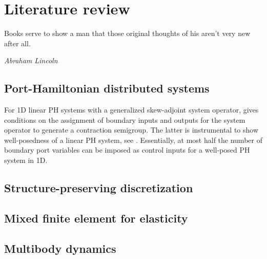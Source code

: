 \chapter[Literature review]{Literature review}

\epigraph{Books serve to show a man that those original thoughts of his aren't very new after all.}{\textit{Abraham Lincoln}}



\section{Port-Hamiltonian distributed systems}

 For 1D linear PH systems with a generalized skew-adjoint system operator, \cite{legorrec2005} gives conditions on the assignment of boundary inputs and outputs for the system operator to generate a contraction
semigroup. The latter is instrumental to show well-posedness of a linear PH
system, see \cite{zwart2012}. Essentially, at most half the number of boundary port variables
can be imposed as control inputs for a well-posed PH system in 1D.

\section{Structure-preserving discretization}

\section{Mixed finite element for elasticity}

\section{Multibody dynamics}